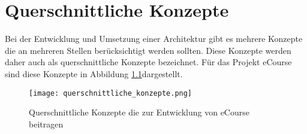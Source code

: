 \chapter{Querschnittliche Konzepte}
\label{sec:quer}

Bei der Entwicklung und Umsetzung einer Architektur gibt es mehrere Konzepte die an mehreren Stellen berücksichtigt werden sollten. Diese Konzepte werden daher auch als querschnittliche Konzepte bezeichnet. Für das Projekt eCourse sind diese Konzepte in Abbildung \ref{fib:querschnitt}dargestellt.


\begin{landscape}
\begin{figure}[H]
\centering
\texttt{[image: querschnittliche\_konzepte.png]}
\caption{Querschnittliche Konzepte die zur Entwicklung von eCourse beitragen}
\label{fib:querschnitt}
\end{figure}
\end{landscape}
